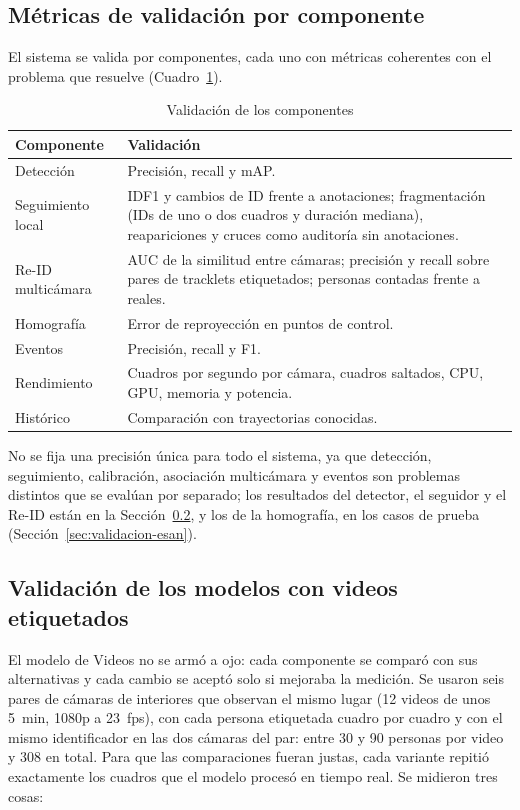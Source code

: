 \documentclass[12pt,a4paper]{article}
\begin{document}
\subsection{Métricas de validación por componente}

El sistema se valida por componentes, cada uno con métricas
coherentes con el problema que resuelve
(Cuadro~\ref{tab:validation_methodology}).

\begin{table}[H]
\caption{Validación de los componentes}
\label{tab:validation_methodology}
\centering
\footnotesize
\begin{tabular}{|p{}|p{}|}
\hline
\textbf{Componente} & \textbf{Validación} \\
\hline
Detección & Precisión, recall y mAP. \\
\hline
Seguimiento local & IDF1 y cambios de ID frente a anotaciones; fragmentación (IDs de uno o dos cuadros y duración mediana), reapariciones y cruces como auditoría sin anotaciones. \\
\hline
Re-ID multicámara & AUC de la similitud entre cámaras; precisión y recall sobre pares de tracklets etiquetados; personas contadas frente a reales. \\
\hline
Homografía & Error de reproyección en puntos de control. \\
\hline
Eventos & Precisión, recall y F1. \\
\hline
Rendimiento & Cuadros por segundo por cámara, cuadros saltados, CPU, GPU, memoria y potencia. \\
\hline
Histórico & Comparación con trayectorias conocidas. \\
\hline
\end{tabular}
\end{table}

No se fija una precisión única para todo el sistema, ya que detección,
seguimiento, calibración, asociación multicámara y eventos son problemas
distintos que se evalúan por separado; los resultados del detector, el
seguidor y el Re-ID están en la Sección~\ref{sec:validacion-modelos}, y los de
la homografía, en los casos de prueba (Sección~\ref{sec:validacion-esan}).

\subsection{Validación de los modelos con videos etiquetados}
\label{sec:validacion-modelos}

El modelo de Videos no se armó a ojo: cada componente se comparó con sus
alternativas y cada cambio se aceptó solo si mejoraba la medición. Se usaron
seis pares de cámaras de interiores que observan el mismo lugar (12 videos de
unos 5~min, 1080p a 23~fps), con cada persona etiquetada cuadro por cuadro y
con el mismo identificador en las dos cámaras del par: entre 30 y 90 personas
por video y 308 en total. Para que las comparaciones fueran justas, cada
variante repitió exactamente los cuadros que el modelo procesó en tiempo real.
Se midieron tres cosas:
\end{document}
